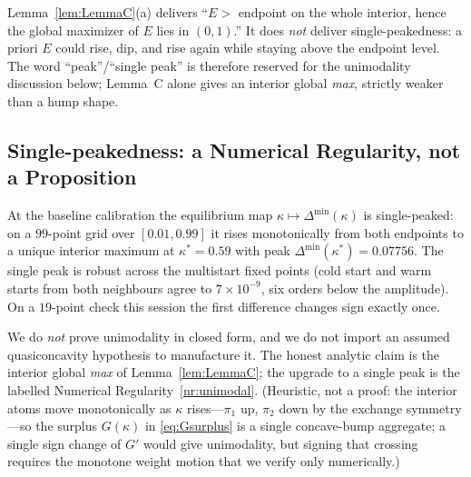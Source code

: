 \begin{remark}
\label{rem:lemmaC-scope}
Lemma~\ref{lem:LemmaC}(a) delivers ``$E>$ endpoint on the whole interior, hence
the global maximizer of $E$ lies in $(0,1)$.'' It does \emph{not} deliver
single-peakedness: a priori $E$ could rise, dip, and rise again while staying
above the endpoint level. The word ``peak''/``single peak'' is therefore
reserved for the unimodality discussion below; Lemma~C alone gives an interior
global \emph{max}, strictly weaker than a hump shape.
\end{remark}

\subsection*{Single-peakedness: a Numerical Regularity, not a Proposition}

\begin{numreg}
\label{nr:unimodal}
At the baseline calibration the equilibrium map
$\kappa\mapsto\Delta^{\min}(\kappa)$ is single-peaked: on a $99$-point grid over
$[0.01,0.99]$ it rises monotonically from both endpoints to a unique interior
maximum at $\kappa^{\ast}=0.59$ with peak $\Delta^{\min}(\kappa^\ast)=0.07756$.
The single peak is robust across the multistart fixed points (cold start and
warm starts from both neighbours agree to $7\times10^{-9}$, six orders below
the amplitude). On a $19$-point check this session the first difference changes
sign exactly once.
\end{numreg}

We do \emph{not} prove unimodality in closed form, and we do not import an
assumed quasiconcavity hypothesis to manufacture it. The honest analytic claim
is the interior global \emph{max} of Lemma~\ref{lem:LemmaC}; the upgrade to a
single peak is the labelled Numerical Regularity~\ref{nr:unimodal}. (Heuristic,
not a proof: the interior atoms move monotonically as $\kappa$ rises---$\pi_1$
up, $\pi_2$ down by the exchange symmetry---so the surplus $G(\kappa)$ in
\eqref{eq:Gsurplus} is a single concave-bump aggregate; a single sign change of
$G'$ would give unimodality, but signing that crossing requires the monotone
weight motion that we verify only numerically.)

